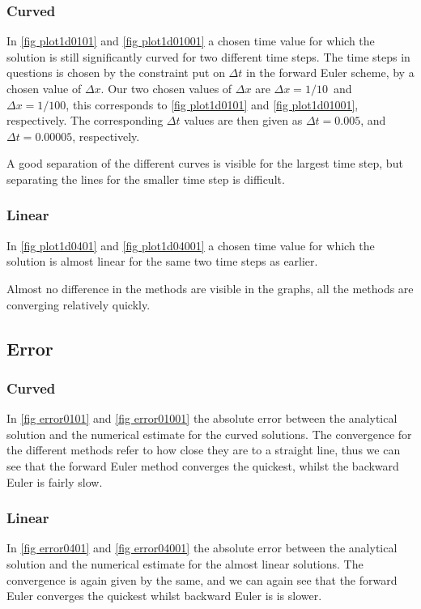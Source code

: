 \documentclass[%
reprint,
nofootinbib,
amsmath,amssymb,
aps,
]{revtex4-1}
\newcommand{\dt}{{\Delta t}}
\newcommand{\dx}{{\Delta x}}
\begin{document}
\subsubsection{Curved}
In \autoref{fig plot1d0101} and \autoref{fig plot1d01001} a chosen time value for which the solution is still significantly curved for two different time steps. The time steps in questions is chosen by the constraint put on $\dt$ in the forward Euler scheme, by a chosen value of $\dx$. Our two chosen values of $\dx$ are $\dx = 1/10$ and $\dx = 1/100$, this corresponds to \autoref{fig plot1d0101} and \autoref{fig plot1d01001}, respectively. The corresponding $\dt$ values are then given as $\dt = 0.005$, and $\dt = 0.00005$, respectively. 


A good separation of the different curves is visible for the largest time step, but separating the lines for the smaller time step is difficult. 
\subsubsection{Linear}
In \autoref{fig plot1d0401} and \autoref{fig plot1d04001} a chosen time value for which the solution is almost linear for the same two time steps as earlier. 

Almost no difference in the methods are visible in the graphs, all the methods are converging relatively quickly. 
\subsection{Error}
\subsubsection{Curved}
In \autoref{fig error0101} and \autoref{fig error01001} the absolute error between the analytical solution and the numerical estimate for the curved solutions. The convergence for the different methods refer to how close they are to a straight line, thus we can see that the forward Euler method converges the quickest, whilst the backward Euler is fairly slow. 
\subsubsection{Linear}
In \autoref{fig error0401} and \autoref{fig error04001} the absolute error between the analytical solution and the numerical estimate for the almost linear solutions. The convergence is again given by the same, and we can again see that the forward Euler converges the quickest whilst backward Euler is is slower. 
\end{document}

